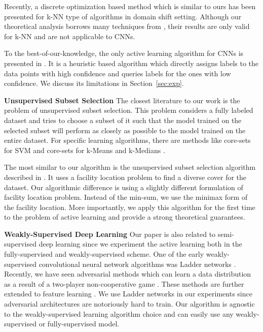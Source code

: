 \documentclass{article}
\begin{document}
Recently, a discrete optimization based method \cite{BerlindU15} which is similar to ours has been presented for k-NN type of algorithms in domain shift setting. Although our theoretical analysis borrows many techniques from \cite{BerlindU15}, their results are only valid for k-NN and are not applicable to CNNs.

To the best-of-our-knowledge, the only active learning algorithm for CNNs is presented in \cite{wang2016cost}. It is a heuristic based algorithm which directly assigns labels to the data points with high confidence and queries labels for the ones with low confidence. We discuss its limitations in Section~\ref{sec:exp}.

\noindent\textbf{Unsupervised Subset Selection}
The closest literature to our work is the problem of unsupervised subset selection. This problem considers a fully labeled dataset and tries to choose a subset of it such that the model trained on the selected subset will perform as closely as possible to the model trained on the entire dataset. For specific learning algorithms, there are methods like core-sets for SVM \cite{tsang2005core} and core-sets for k-Means and k-Medians \cite{har2005smaller}. %

The most similar to our algorithm is the unsupervised subset selection algorithm described in \cite{wei2013using}. It uses a facility location problem to find a diverse cover for the dataset. Our algorithmic difference is using a slightly different formulation of facility location problem. Instead of the min-sum, we use the minimax \cite{facility} form of the facility location. More importantly, we apply this algorithm for the first time to the problem of active learning and provide a strong theoretical guarantees.
 
\noindent\textbf{Weakly-Supervised Deep Learning}
Our paper is also related to semi-supervised deep learning since we experiment the active learning both in the fully-supervised and weakly-supervised scheme. 
One of the early weakly-supervised convolutional neural network algorithms was Ladder networks \cite{ladder}. Recently, we have seen adversarial methods which can learn a data distribution as a result of a two-player non-cooperative game \cite{salimans2016improved,gan_original,dcgan}. These methods are further extended to feature learning \cite{ali, bigan}. We use Ladder networks in our experiments since adversarial architectures are notoriously hard to train. Our algorithm is agnostic to the weakly-supervised learning algorithm choice and can easily use any weakly-supervised or fully-supervised model.
\end{document}
